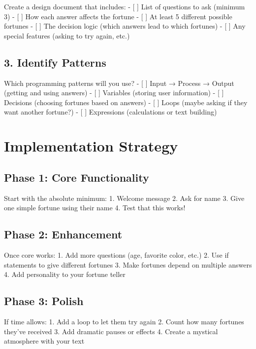 \documentclass[
  letterpaper,
  DIV=11,
  numbers=noendperiod,
  oneside]{scrreprt}
\begin{document}
Create a design document that includes: - {[} {]} List of questions to
ask (minimum 3) - {[} {]} How each answer affects the fortune - {[} {]}
At least 5 different possible fortunes - {[} {]} The decision logic
(which answers lead to which fortunes) - {[} {]} Any special features
(asking to try again, etc.)

\subsection{3. Identify Patterns}\label{identify-patterns}

Which programming patterns will you use? - {[} {]} Input → Process →
Output (getting and using answers) - {[} {]} Variables (storing user
information) - {[} {]} Decisions (choosing fortunes based on answers) -
{[} {]} Loops (maybe asking if they want another fortune?) - {[} {]}
Expressions (calculations or text building)

\section{Implementation Strategy}\label{implementation-strategy}

\subsection{Phase 1: Core
Functionality}\label{phase-1-core-functionality}

Start with the absolute minimum: 1. Welcome message 2. Ask for name 3.
Give one simple fortune using their name 4. Test that this works!

\subsection{Phase 2: Enhancement}\label{phase-2-enhancement}

Once core works: 1. Add more questions (age, favorite color, etc.) 2.
Use if statements to give different fortunes 3. Make fortunes depend on
multiple answers 4. Add personality to your fortune teller

\subsection{Phase 3: Polish}\label{phase-3-polish}

If time allows: 1. Add a loop to let them try again 2. Count how many
fortunes they've received 3. Add dramatic pauses or effects 4. Create a
mystical atmosphere with your text
\end{document}
